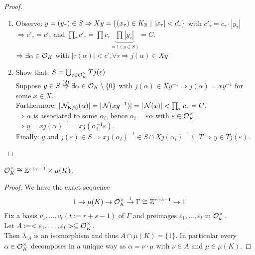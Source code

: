 \begin{proof}
\begin{enumerate}[(1)]
\item Observe: $y=(y_\tau) \in S \Rightarrow Xy=\{(x_\tau) \in K_{\mathbb{R}} \ | \ |x_\tau| < c'_\tau\}$
 with $c'_\tau = c_\tau \cdot | y_\tau|$\\
 $\Rightarrow c'_\tau = c'_{\bar{\tau}}$ and
 $\prod_\tau c'_\tau = \prod c_\tau \underbrace{\prod |y_\tau|}_{=1 (y \in S)} = C.$\\
 $\Rightarrow \exists \alpha \in \mathcal{O}_K$ with $|\tau(\alpha)| < c'_\tau \forall \tau \Rightarrow j(\alpha) \in Xy$
 \item Show that: $S= \bigcup_{\varepsilon \in \mathcal{O}^\times_K} Tj(\varepsilon)$\\
 Suppose $y \in S \stackrel{(2)}{\Rightarrow} \exists \alpha \in \mathcal{O}_K \setminus \{0\}$ with $j(\alpha) \in Xy^{-1} \Rightarrow j(\alpha)=xy^{-1}$ for some $x \in X$.\\
Furthermore: $|\operatorname{\mathcal{N}_{K/\mathbb{Q}}}(\alpha)|=|\operatorname{\mathcal{N}}(xy^{-1})|=|\operatorname{\mathcal{N}}(x)|<\prod_\tau c_\tau =C$.\\
$\Rightarrow \alpha$ is associated to some $\alpha_i$, hence $\alpha_i = \varepsilon \alpha$ with $\varepsilon \in \mathcal{O}^\times_K$.\\
$\Rightarrow y = xj(\alpha)^{-1} = xj(\alpha_i^{-1} \varepsilon)$.\\
Finally: $y$ and $j(\varepsilon) \in S \Rightarrow x j(\alpha_i)^{-1} \in S\cap Xj(\alpha_i)^{-1} \subseteq T \Rightarrow y \in T j(\varepsilon)$.
\end{enumerate}
\end{proof}

\begin{Kor}
$\mathcal{O}^\times_K \cong \mathbb{Z}^{r+s-1} \times \mu(K)$.
\end{Kor}

\begin{proof}
We have the exact sequence
\[1 \to \mu(K) \to \mathcal{O}_K^\times \stackrel{l}{\to} \Gamma \cong \mathbb{Z}^{r+s-1} \to 1\]
Fix a basis $v_1, \dots, v_t (t:=r+s-1)$ of $\Gamma$ and preimages $\varepsilon_1, \dots, \varepsilon_t$ in $\mathcal{O}_k^\times$.\\
Let $A:= <\varepsilon_1, \dots, \varepsilon_t> \subseteq \mathcal{O}_K^\times$.\\
Then $\lambda_{|A}$ is an isomorphism and thus $A \cap \mu(K)=\{1\}$. In particular every $\alpha \in \mathcal{O}^\times_K$ decomposes in a unique way as $\alpha = \nu \cdot \mu$ with $\nu \in A$ and $\mu \in \mu(K)$.
\end{proof}